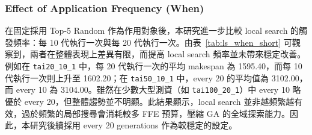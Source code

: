 \documentclass[conference]{IEEEtran}
\begin{document}
\begin{table}[htbp]
\caption{Local Search選擇不同目標時之平均與最小 Makespan}
\label{tab:ls_who_short}
\centering
{}
\end{table}


\subsubsection{Effect of Application Frequency (When)}
在固定採用 Top-5 Random 作為作用對象後，本研究進一步比較 local search 的觸發頻率：每 10 代執行一次與每 20 代執行一次。由表~\ref{tab:ls_when_short} 可觀察到，兩者在整體表現上差異有限，而提高 local search 頻率並未帶來穩定改善。例如在 \texttt{tai20\_10\_1} 中，每 20 代執行一次的平均 makespan 為 1595.40，而每 10 代執行一次則上升至 1602.20；在 \texttt{tai50\_10\_1} 中，every 20 的平均值為 3102.00，而 every 10 為 3104.00。雖然在少數大型測資（如 \texttt{tai100\_20\_1}）中 every 10 略優於 every 20，但整體趨勢並不明顯。此結果顯示，local search 並非越頻繁越有效，過於頻繁的局部搜尋會消耗較多 FFE 預算，壓縮 GA 的全域探索能力。因此，本研究後續採用 every 20 generations 作為較穩定的設定。
\end{document}

